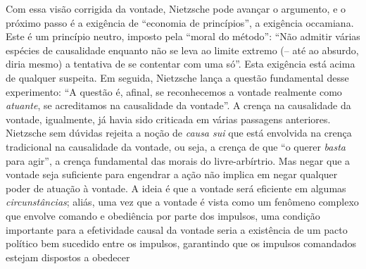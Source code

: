 \documentclass[
	12pt,				%
	openright,			%
	oneside,			%
	a4paper,			%
	english,			%
	french,				%
	spanish,			%
	brazil				%
	]{abntex2}
\begin{document}
Com essa visão corrigida da vontade, Nietzsche pode avançar o argumento, e o próximo passo é a exigência de “economia de princípios”, a exigência occamiana. Este é um princípio neutro, imposto pela “moral do método”:  “Não admitir várias espécies de causalidade enquanto não se leva ao limite extremo (– até ao absurdo, diria mesmo) a tentativa de se contentar com uma só”. Esta exigência está acima de qualquer suspeita. Em seguida, Nietzsche lança a questão fundamental desse experimento: “A questão é, afinal, se reconhecemos a vontade realmente como \textit{atuante}, se acreditamos na causalidade da vontade”. A crença na causalidade da vontade, igualmente, já havia sido criticada em várias passagens anteriores. Nietzsche sem dúvidas rejeita a noção de \textit{causa sui} que está envolvida na crença tradicional na causalidade da vontade, ou seja, a crença de que “o querer \textit{basta} para agir”, a crença fundamental das morais do livre-arbírtrio. Mas negar que a vontade seja suficiente para engendrar a ação não implica em negar qualquer poder de atuação à vontade. A ideia é que a vontade será eficiente em algumas \textit{circunstâncias}; aliás, uma vez que a vontade é vista como um fenômeno complexo que envolve comando e obediência por parte dos impulsos, uma condição importante para a efetividade causal da vontade seria a existência de um pacto político bem sucedido entre os impulsos, garantindo que os impulsos comandados estejam dispostos a obedecer
\end{document}
